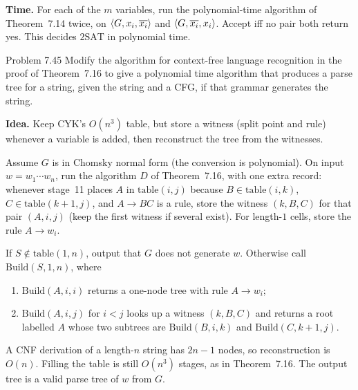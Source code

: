 \begin{soln}
\textbf{Time.}
For each of the $m$ variables, run the polynomial-time algorithm of Theorem~7.14 twice, on $\langle G,x_i,\overline{x_i}\rangle$ and $\langle G,\overline{x_i},x_i\rangle$. Accept iff no pair both return yes. This decides $\mathrm{2SAT}$ in polynomial time.
\end{soln}

\begin{question}{Problem 7.45}
Modify the algorithm for context-free language recognition in the proof of Theorem~7.16 to give a polynomial time algorithm that produces a parse tree for a string, given the string and a CFG, if that grammar generates the string.
\end{question}
\begin{soln}
\textbf{Idea.} Keep CYK's $O(n^3)$ table, but store a witness (split point and rule) whenever a variable is added, then reconstruct the tree from the witnesses.

Assume $G$ is in Chomsky normal form (the conversion is polynomial). On input $w=w_1\cdots w_n$, run the algorithm $D$ of Theorem~7.16, with one extra record: whenever stage~11 places $A$ in $\mathrm{table}(i,j)$ because $B\in\mathrm{table}(i,k)$, $C\in\mathrm{table}(k+1,j)$, and $A\to BC$ is a rule, store the witness $(k,B,C)$ for that pair $(A,i,j)$ (keep the first witness if several exist). For length-$1$ cells, store the rule $A\to w_i$.

If $S\notin\mathrm{table}(1,n)$, output that $G$ does not generate $w$. Otherwise call $\mathrm{Build}(S,1,n)$, where
\begin{enumerate}
\item $\mathrm{Build}(A,i,i)$ returns a one-node tree with rule $A\to w_i$;
\item $\mathrm{Build}(A,i,j)$ for $i<j$ looks up a witness $(k,B,C)$ and returns a root labelled $A$ whose two subtrees are $\mathrm{Build}(B,i,k)$ and $\mathrm{Build}(C,k+1,j)$.
\end{enumerate}
A CNF derivation of a length-$n$ string has $2n-1$ nodes, so reconstruction is $O(n)$. Filling the table is still $O(n^3)$ stages, as in Theorem~7.16. The output tree is a valid parse tree of $w$ from $G$.
\end{soln}

